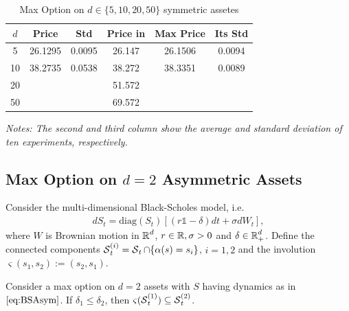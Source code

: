 \begin{table}[ht]
\caption{Max Option on $d \in\{5,10,20,50\}$ symmetric assetes}
\label{lab:symMaxOpt}
  \centering
  \begin{tabular}{ c c c c c c}
 \hline  \hline
   $d$ &  {\bf{Price}}&  {\bf{Std}}&  {\bf{Price in \cite{Becker2}}}&
    {\bf{Max Price}} & {\bf{Its Std}}\\
  \hline \hline
  5   & 26.1295 &  0.0095 & 26.147 &26.1506 &  0.0094 \\
  10   & 38.2735 &  0.0538 & 38.272 & 38.3351 &  0.0089  \\
    20   &  &   & 51.572 &  &    \\
  50  &  &   & 69.572  &  &   \\
 \hline
\end{tabular}

\vspace{2mm
}
 \scriptsize{
\textit{Notes: The second and third column show the average and standard deviation of ten experiments, respectively.  }}
  \end{table}
  
\subsection{Max Option on $d=2$ Asymmetric Assets}\label{sec:maxCallAsym}
Consider the multi-dimensional Black-Scholes model, i.e. 
\begin{align}\label{eq:BSAsym}
    d S_t = \text{diag}(S_t) \left[ (r\mathds{1} - \delta)dt + \sigma dW_t\right],
\end{align}
where $W$ is Brownian motion in $\operatorname{\mathbb{R}}^d$, $r \in \operatorname{\mathbb{R}} ,\sigma > 0$ and $\delta \in \operatorname{\mathbb{R}}_+^d$. 
Define the connected components $\operatorname{\mathcal{S}}^{(i)}_t = \operatorname{\mathcal{S}}_t \cap \{\alpha(s) = s_i\}$, $i=1,2$ and the involution   $\varsigma(s_1,s_2) := (s_2,s_1)$.  

\begin{proposition} Consider a max option on $d=2$ assets with $S$ having dynamics as in $\eqref{eq:BSAsym}$. If $\delta_1 \le \delta_2$, then $\varsigma(\operatorname{\mathcal{S}}^{(1)}_t) \subseteq \operatorname{\mathcal{S}}^{(2)}_t$. 
\end{proposition}

